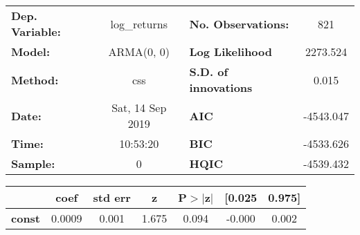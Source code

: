 \begin{center}
\begin{tabular}{lclc}
\toprule
\textbf{Dep. Variable:} &   log\_returns   & \textbf{  No. Observations:  } &    821      \\
\textbf{Model:}         &    ARMA(0, 0)    & \textbf{  Log Likelihood     } &  2273.524   \\
\textbf{Method:}        &       css        & \textbf{  S.D. of innovations} &   0.015     \\
\textbf{Date:}          & Sat, 14 Sep 2019 & \textbf{  AIC                } & -4543.047   \\
\textbf{Time:}          &     10:53:20     & \textbf{  BIC                } & -4533.626   \\
\textbf{Sample:}        &        0         & \textbf{  HQIC               } & -4539.432   \\
\bottomrule
\end{tabular}
\begin{tabular}{lcccccc}
               & \textbf{coef} & \textbf{std err} & \textbf{z} & \textbf{P$> |$z$|$} & \textbf{[0.025} & \textbf{0.975]}  \\
\midrule
\textbf{const} &       0.0009  &        0.001     &     1.675  &         0.094        &       -0.000    &        0.002     \\
\bottomrule
\end{tabular}
\end{center}
